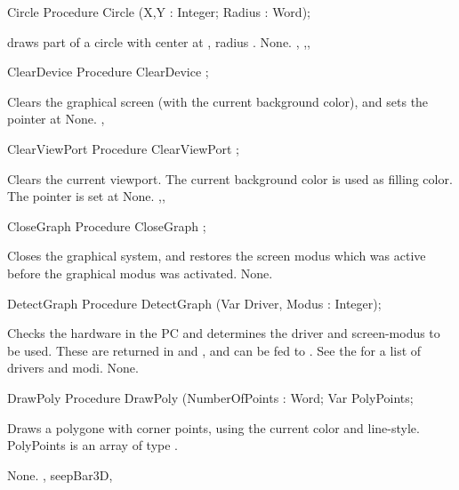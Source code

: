\begin{procedure}{Circle}
\Declaration
Procedure Circle (X,Y : Integer; Radius : Word);

\Description
  draws part of a circle with center at , radius
.
\Errors
None.
\SeeAlso
{},
,, 
\end{procedure}

\begin{procedure}{ClearDevice}
\Declaration
Procedure ClearDevice ;

\Description
Clears the graphical screen (with the current
background color), and sets the pointer at 
\Errors
None.
\SeeAlso
{}, 
\end{procedure}

\begin{procedure}{ClearViewPort}
\Declaration
Procedure ClearViewPort ;

\Description
Clears the current viewport. The current background color is used as filling
color. The pointer is set at
\Errors
None.
\SeeAlso
{},, 
\end{procedure}

\begin{procedure}{CloseGraph}
\Declaration
Procedure CloseGraph ;

\Description
Closes the graphical system, and restores the
screen modus which was active before the graphical modus was
activated.
\Errors
None.
\SeeAlso
{}
\end{procedure}

\begin{procedure}{DetectGraph}
\Declaration
Procedure DetectGraph (Var Driver, Modus : Integer);

\Description
 Checks the hardware in the PC and determines the driver and screen-modus to
be used. These are returned in  and , and can be fed
to . 
See the  for a list of drivers and modi.
\Errors
None.
\SeeAlso
{}
\end{procedure}

\begin{procedure}{DrawPoly}
\Declaration
Procedure DrawPoly (NumberOfPoints : Word; Var PolyPoints;

\Description

Draws a polygone with  corner points, using the
current color and line-style. PolyPoints is an array of type .

\Errors
None.
\SeeAlso
{}, seep{Bar3D}, 
\end{procedure}

